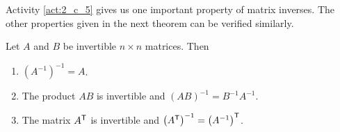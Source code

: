 Activity \ref{act:2_c_5} gives us one important property of matrix inverses. The other properties given in the next theorem can be verified similarly.



\begin{theorem} \label{thm:inverse_properties} Let $A$ and $B$ be invertible $n \times n$ matrices. Then
\begin{enumerate}
\item $\left(A^{-1}\right)^{-1} = A$.
\item The product $AB$ is invertible and  $(AB)^{-1} = B^{-1}A^{-1}$.
\item The matrix $A^{\mathsf{T}}$ is invertible and $\left(A^{\mathsf{T}}\right)^{-1} = \left(A^{-1}\right)^{\mathsf{T}}$.
\end{enumerate}
\end{theorem}


\ExampleIntro

